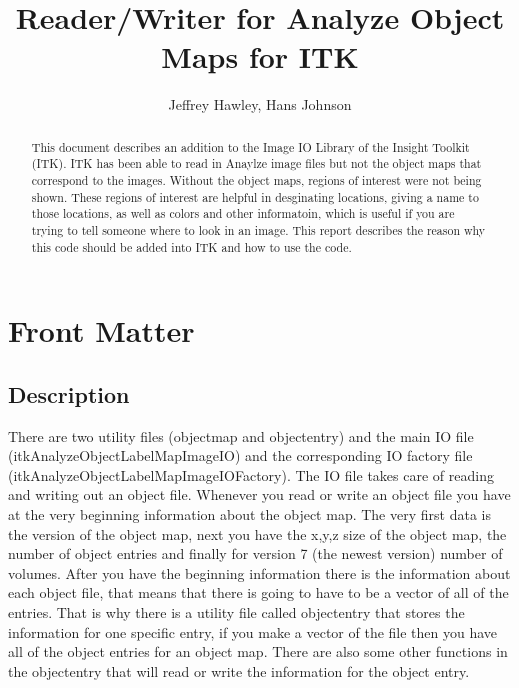\documentclass{InsightArticle}
\title{Reader/Writer for Analyze Object Maps for ITK}
\author{Jeffrey Hawley, Hans Johnson }
\begin{document}
\ifpdf
\else
\fi


\maketitle


\ifhtml
\chapter*{Front Matter\label{front}}
\fi


\begin{abstract}
\noindent
This document describes an addition to the Image IO Library of the Insight Toolkit (ITK).
ITK has been able to read in Anaylze image files but not the object maps that correspond
to the images.  Without the object maps, regions of interest were not being shown.
These regions of interest are helpful in desginating locations, giving a name to those
locations, as well as colors and other informatoin, which is useful if you are trying to tell
someone where to look in an image.  This report describes the reason why this code should be
added into ITK and how to use the code.
\end{abstract}

\tableofcontents

\section{Description}
There are two utility files (objectmap and objectentry) and the main IO file (itkAnalyzeObjectLabelMapImageIO) and the corresponding
IO factory file (itkAnalyzeObjectLabelMapImageIOFactory).  The IO file takes care of reading and writing out an object file.  Whenever
you read or write an object file you have at the very beginning information about the object map.  The very first data is the version
of the object map, next you have the x,y,z size of the object map, the number of object entries and finally for version 7 (the newest
version) number of volumes.  After you have the beginning information there is the information about each object file, that means that
there is going to have to be a vector of all of the entries.  That is why there is a utility file called objectentry that stores the
information for one specific entry, if you make a vector of the file then you have all of the object entries for an object map.  There
are also some other functions in the objectentry that will read or write the information for the object entry.
\end{document}
